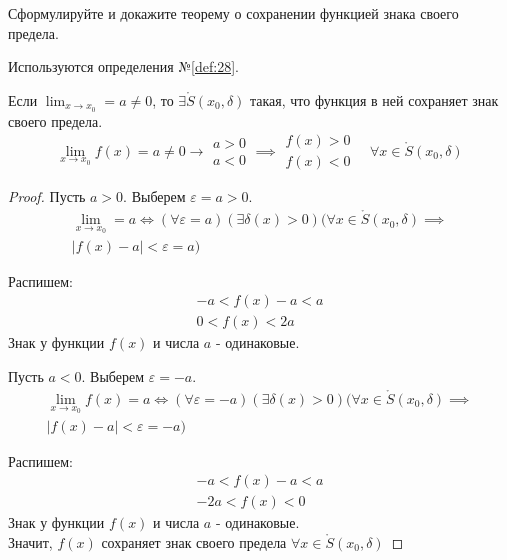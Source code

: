 \begin{question}
    Сформулируйте и докажите теорему о сохранении функцией знака своего предела.
\end{question}
\begin{used}
    Используются определения №\ref{def:28}.
\end{used}
\begin{theorem}
    Если $\lim_{x \to x_0} = a \neq 0$, то $\exists \mathring{S}(x_0, \delta)$ такая, что функция в ней сохраняет знак своего предела. \[
        \lim_{x \to x_0} f(x) = a \neq 0 \to 
        \begin{matrix}
            a > 0 \\
            a < 0
        \end{matrix}
        \implies 
        \begin{matrix}
            f(x) > 0 \\
            f(x) < 0
        \end{matrix}
        \quad
        \forall x \in \mathring{S}(x_0, \delta)
    \] 
\end{theorem}
\begin{proof}
    Пусть $a > 0$. Выберем  $\varepsilon = a > 0$.
    \begin{gather*}
        \lim_{x \to x_0} = a \iff (\forall \varepsilon = a)(\exists  \delta(x) > 0) (\forall x \in \mathring{S}(x_0, \delta) \implies \\
        |f(x)- a| < \varepsilon = a) 
    \end{gather*}

      Распишем:
    \begin{gather*}
        -a < f(x) - a < a \\
        \boxed{0 < f(x) < 2a}
    \end{gather*}
    Знак у функции $f(x)$ и числа $a$ - одинаковые.

    Пусть $a < 0$. Выберем  $\varepsilon = -a$.
    \begin{gather*}
        \lim_{x \to x_0} f(x) = a \iff (\forall \varepsilon = -a)(\exists  \delta(x) > 0) (\forall x \in \mathring{S}(x_0, \delta) \implies \\
        |f(x) - a| < \varepsilon = -a) 
    \end{gather*}

    Распишем:
    \begin{gather*}
        -a < f(x) - a < a \\
        \boxed{-2a < f(x) < 0}
    \end{gather*}
    Знак у функции $f(x)$ и числа  $a$ - одинаковые.
    \\
    Значит, $f(x)$ сохраняет знак своего предела  $\forall x \in \mathring{S}(x_0, \delta)$ 
\end{proof}
\pagebreak



